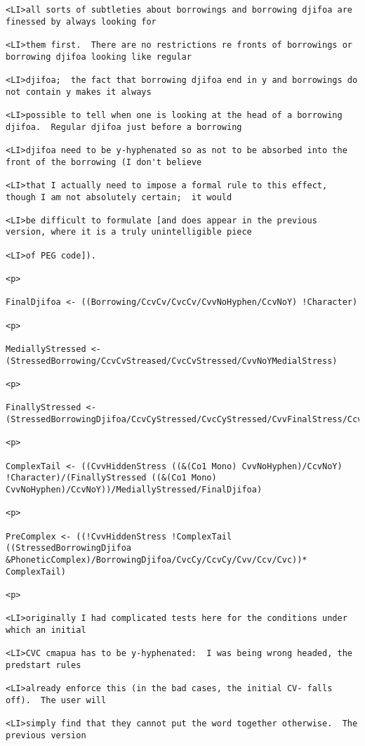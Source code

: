 \documentclass[12pt]{article}
\begin{document}
\begin{lstlisting}
<LI>all sorts of subtleties about borrowings and borrowing djifoa are finessed by always looking for

<LI>them first.  There are no restrictions re fronts of borrowings or borrowing djifoa looking like regular

<LI>djifoa;  the fact that borrowing djifoa end in y and borrowings do not contain y makes it always

<LI>possible to tell when one is looking at the head of a borrowing djifoa.  Regular djifoa just before a borrowing

<LI>djifoa need to be y-hyphenated so as not to be absorbed into the front of the borrowing (I don't believe

<LI>that I actually need to impose a formal rule to this effect, though I am not absolutely certain;  it would

<LI>be difficult to formulate [and does appear in the previous version, where it is a truly unintelligible piece

<LI>of PEG code]).

<p>

FinalDjifoa <- ((Borrowing/CcvCv/CvcCv/CvvNoHyphen/CcvNoY) !Character)

<p>

MediallyStressed <- (StressedBorrowing/CcvCvStreased/CvcCvStressed/CvvNoYMedialStress)

<p>

FinallyStressed <- (StressedBorrowingDjifoa/CcvCyStressed/CvcCyStressed/CvvFinalStress/CcvStressed/CvcStressed)

<p>

ComplexTail <- ((CvvHiddenStress ((&(Co1 Mono) CvvNoHyphen)/CcvNoY) !Character)/(FinallyStressed ((&(Co1 Mono) CvvNoHyphen)/CcvNoY))/MediallyStressed/FinalDjifoa)

<p>

PreComplex <- ((!CvvHiddenStress !ComplexTail ((StressedBorrowingDjifoa &PhoneticComplex)/BorrowingDjifoa/CvcCy/CcvCy/Cvv/Ccv/Cvc))* ComplexTail)

<p>

<LI>originally I had complicated tests here for the conditions under which an initial

<LI>CVC cmapua has to be y-hyphenated:  I was being wrong headed, the predstart rules

<LI>already enforce this (in the bad cases, the initial CV- falls off).  The user will

<LI>simply find that they cannot put the word together otherwise.  The previous version


\end{lstlisting}
\end{document}
